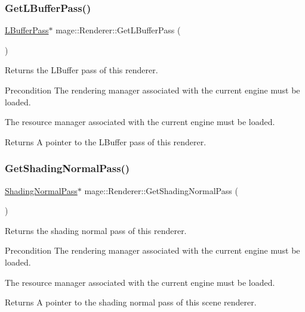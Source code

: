 \subsubsection{\texorpdfstring{Get\+L\+Buffer\+Pass()}{GetLBufferPass()}}
{\footnotesize\ttfamily \hyperlink{structmage_1_1_l_buffer_pass}{L\+Buffer\+Pass}$\ast$ mage\+::\+Renderer\+::\+Get\+L\+Buffer\+Pass (\begin{DoxyParamCaption}{ }\end{DoxyParamCaption})}

Returns the L\+Buffer pass of this renderer.

\begin{DoxyPrecond}{Precondition}
The rendering manager associated with the current engine must be loaded. 

The resource manager associated with the current engine must be loaded. 
\end{DoxyPrecond}
\begin{DoxyReturn}{Returns}
A pointer to the L\+Buffer pass of this renderer. 
\end{DoxyReturn}
\hypertarget{classmage_1_1_renderer_a57e18039593423628715375e7a1b1163}{}\label{classmage_1_1_renderer_a57e18039593423628715375e7a1b1163} 
\subsubsection{\texorpdfstring{Get\+Shading\+Normal\+Pass()}{GetShadingNormalPass()}}
{\footnotesize\ttfamily \hyperlink{classmage_1_1_shading_normal_pass}{Shading\+Normal\+Pass}$\ast$ mage\+::\+Renderer\+::\+Get\+Shading\+Normal\+Pass (\begin{DoxyParamCaption}{ }\end{DoxyParamCaption})}

Returns the shading normal pass of this renderer.

\begin{DoxyPrecond}{Precondition}
The rendering manager associated with the current engine must be loaded. 

The resource manager associated with the current engine must be loaded. 
\end{DoxyPrecond}
\begin{DoxyReturn}{Returns}
A pointer to the shading normal pass of this scene renderer. 
\end{DoxyReturn}
\hypertarget{classmage_1_1_renderer_ad81ae84e11337dc699d4c6fb2d367e4d}{}\label{classmage_1_1_renderer_ad81ae84e11337dc699d4c6fb2d367e4d} 
